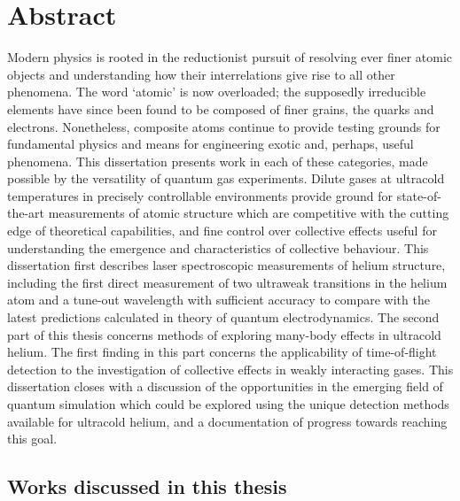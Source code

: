 \chapter*{Abstract}
Modern physics is rooted in the reductionist pursuit of resolving ever finer atomic objects and understanding how their interrelations give rise to all other phenomena. The word `atomic' is now overloaded; the supposedly irreducible elements have since been found to be composed of finer grains, the quarks and electrons. Nonetheless, composite atoms continue to provide testing grounds for fundamental physics and means for engineering exotic and, perhaps, useful phenomena. This dissertation presents work in each of these categories, made possible by the versatility of quantum gas experiments. Dilute gases at ultracold temperatures in precisely controllable environments provide ground for state-of-the-art measurements of atomic structure which are competitive with the cutting edge of theoretical capabilities, and fine control over collective effects useful for understanding the emergence and characteristics of collective behaviour. This dissertation first describes laser spectroscopic measurements of helium structure, including the first direct measurement of two ultraweak transitions in the helium atom and a tune-out wavelength with sufficient accuracy to compare with the latest predictions calculated in theory of quantum electrodynamics. The second part of this thesis concerns methods of exploring many-body effects in ultracold helium. The first finding in this part concerns the applicability of time-of-flight detection to the investigation of collective effects in weakly interacting gases. This dissertation closes with a discussion of the opportunities in the emerging field of quantum simulation which could be explored using the unique detection methods available for ultracold helium, and a documentation of progress towards reaching this goal.


\newpage

\section*{Works discussed in this thesis}


\newcommand{\fullpaper}[5]{\normalsize {{\bf#1}\newline #2, \IfNoValueTF{#5}{\emph{#3}}{\href{#5}{\emph{#3}}} (#4) }}
\newcommand{\citem}[1]{\item[\cite{#1}]}


